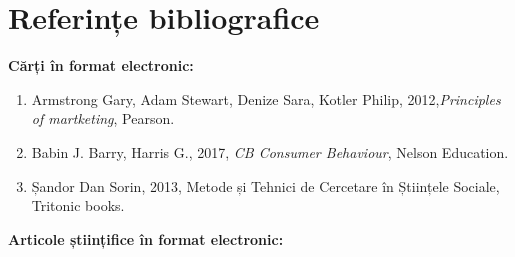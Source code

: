 \documentclass[a4paper, 12pt]{article}
\begin{document}
	\section*{Referințe bibliografice}	
\space
\bigskip
\bigskip
	
	\textbf{Cărți în format electronic:}
	\begin{enumerate}[1.]
	\item Armstrong Gary, Adam Stewart, Denize Sara, Kotler Philip, 2012,\textit{Principles of martketing}, Pearson.
	\item Babin J. Barry, Harris G., 2017, \textit{CB Consumer Behaviour}, Nelson Education.
	\item Șandor Dan Sorin, 2013, Metode și Tehnici de Cercetare în Științele Sociale, Tritonic books.
	\end{enumerate}
	\textbf{Articole științifice în format electronic:}
\end{document}
